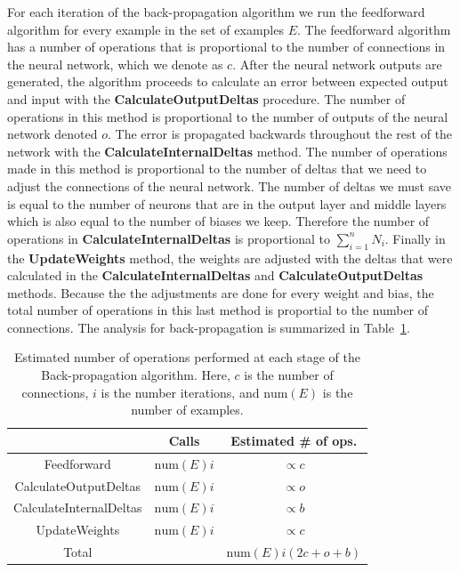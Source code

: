 \documentclass[11pt]{article}
\begin{document}
For each iteration of the back-propagation algorithm we run the feedforward algorithm for every example in the set of examples $E$. The
feedforward algorithm has a number of operations that is proportional to the number of connections in the neural network, which we
denote as $c$. After the neural network outputs are generated, the algorithm proceeds to calculate an error between expected output and
input with the \textbf{CalculateOutputDeltas} procedure. The number of operations in this method is proportional to the number of
outputs of the neural network denoted $o$. The error is propagated backwards throughout the rest of the network with the
\textbf{CalculateInternalDeltas} method. The number of operations made in this method is proportional to the number of deltas that we
need to adjust the connections of the neural network. The number of deltas we must save is equal to the number of neurons that are in
the output layer and middle layers which is also equal to the number of biases we keep. Therefore the number of operations in
\textbf{CalculateInternalDeltas} is proportional to $\sum_{i=1}^{n}N_{i}$. Finally in the \textbf{UpdateWeights} method, the weights are
adjusted with the deltas that were calculated in the \textbf{CalculateInternalDeltas} and \textbf{CalculateOutputDeltas} methods.
Because the the adjustments are done for every weight and bias, the total number of operations in this last method is proportial to the
number of connections. The analysis for back-propagation is summarized in Table~\ref{tab:backpropagation}.

\begin{table}
	\begin{center}
		\label{tab:backpropagation}
		\begin{tabular}{ccc}
		\hline
		& Calls & Estimated \# of ops.\\
		\hline
		Feedforward & $\mbox{num}(E)i$ & $\propto c$\\
		CalculateOutputDeltas & $\mbox{num}(E)i$ & $\propto o$\\
		CalculateInternalDeltas & $\mbox{num}(E)i$ & $\propto b$\\
		UpdateWeights & $\mbox{num}(E)i$ & $\propto c$\\
		\hline
		Total & & $\mbox{num}(E)i(2c+o+b)$\\
		\hline
		\end{tabular}
		\caption{Estimated number of operations performed at each stage of the Back-propagation algorithm. Here, $c$ is the number of connections, $i$ is the number iterations, and $\mbox{num}(E)$ is the number of examples.}
	\end{center}
\end{table}
\end{document}
